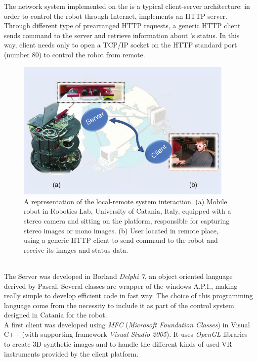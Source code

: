 The network system implemented on the \morduc{} is a typical
client-server architecture: in order to control the robot through
Internet, \morduc{} implements an HTTP server.
\\
Through different type of prearranged HTTP requests, a generic
HTTP client sends command to the server and retrieve information
about \morduc{}'s status. In this way, client needs only to open a TCP/IP
socket on the HTTP standard port (number 80) to control the robot from
remote.
\begin{figure}[h]
  \begin{center}
    \includegraphics[width=300pt]{img/3morduc_client_server.png}
    \caption{A representation of the local-remote system
      interaction. (a) Mobile robot in Robotics Lab, University of
      Catania, Italy, equipped with a stereo camera and sitting on
      the platform, responsible for capturing stereo images or mono
      images. (b) User located in remote place, using a generic HTTP
      client to send command to the robot and receive its images
      and status data.
    }
    \label{fig:3morduc_client_server}
    \end{center}
\end{figure}
\\
The Server was developed in Borland \textit{Delphi 7}, an object oriented
language
derived by Pascal. Several classes are wrapper of the windows A.P.I., making
really simple to develop efficient code in fast way. The choice of this
programming language come from the necessity to include it as part of the
control system designed in Catania for the \morduc{} robot.
\\
A first client was developed using \textit{MFC} (\textit{Microsoft Foundation
Classes}) in Visual C++ (with supporting framework \textit{Visual Studio 2005}).
It uses \textit{OpenGL} libraries to create 3D synthetic images and to handle
the different kinds of used VR instruments provided by the client platform.
